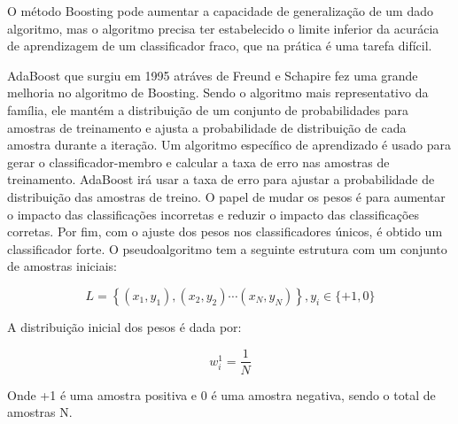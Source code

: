O método Boosting pode aumentar a capacidade de generalização de um dado algoritmo, mas o algoritmo precisa ter estabelecido o limite inferior da acurácia de aprendizagem de um classificador fraco, que na prática é uma tarefa difícil.

AdaBoost que surgiu em 1995 atráves de Freund e Schapire fez uma grande melhoria no algoritmo de Boosting.
Sendo o algoritmo mais representativo da família, ele mantém a distribuição de um conjunto de probabilidades para amostras de treinamento e ajusta a probabilidade de distribuição de cada amostra durante a iteração. Um algoritmo específico de aprendizado é usado para gerar o classificador-membro e calcular a taxa de erro nas amostras de treinamento. AdaBoost irá usar a taxa de erro para ajustar a probabilidade de distribuição das amostras de treino. O papel de mudar os pesos é para aumentar o impacto das classificações incorretas e reduzir o impacto das classificações corretas. Por fim, com o ajuste dos pesos nos classificadores únicos, é obtido um classificador forte.
O pseudoalgoritmo tem a seguinte estrutura com um conjunto de amostras iniciais:

\begin{equation}
    L=\left\{\left(x_{1}, y_{1}\right),\left(x_{2}, y_{2}\right) \cdots\left(x_{N}, y_{N}\right)\right\}, y_{i} \in\{+1,0\}
\end{equation}


A distribuição inicial dos pesos é dada por:

\begin{equation}
    w_{i}^{1}=\frac{1}{N}
\end{equation}

Onde +1 é uma amostra positiva e 0 é uma amostra negativa, sendo o total de amostras N.

